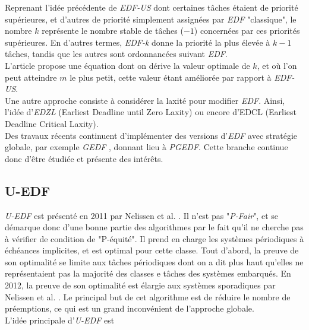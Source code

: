 \documentclass[11pt,a4paper,oneside]{report}
\begin{document}
Reprenant l'idée précédente de \textit{EDF-US} dont certaines tâches étaient de priorité 
supérieures, et d'autres de priorité simplement assignées par \textit{EDF} "classique", 
le nombre $k$ représente le nombre stable de tâches ($-1$) concernées par ces priorités 
supérieures. En d'autres termes, \textit{EDF-k} donne la priorité la plus élevée à 
$k - 1$ tâches, tandis que les autres sont ordonnancées suivant \textit{EDF}.\\

L'article propose une équation dont on dérive la valeur optimale de $k$, et où l'on peut 
atteindre $m$ le plus petit, cette valeur étant améliorée par rapport à \textit{EDF-US}.\\

Une autre approche consiste à considérer la laxité pour modifier \textit{EDF}. 
Ainsi, l'idée d'\textit{EDZL} (Earliest Deadline until Zero Laxity) \cite{cirinei_edzl_2007} ou encore d'EDCL \cite{kato_real-time_2007}
(Earliest Deadline Critical Laxity). \\

Des travaux récents continuent d'implémenter des versions d'\textit{EDF} avec stratégie 
globale, par exemple \textit{GEDF} \cite{li_global_2015}, donnant lieu à \textit{PGEDF}. Cette 
branche continue donc d'être étudiée et présente des intérêts.

\subsection{U-EDF}
\textit{U-EDF} est présenté en 2011 par Nelissen et al. \cite{nelissen_reducing_2011}. Il n'est pas "\textit{P-Fair}", et se démarque donc d'une bonne partie des algorithmes 
par le fait qu'il ne cherche pas à vérifier de condition de "P-équité".
Il prend en charge les systèmes périodiques à échéances implicites, et est optimal pour cette classe. 
Tout d'abord, la preuve de son optimalité se limite aux tâches périodiques dont on a dit plus haut qu'elles 
ne représentaient pas la majorité des classes e tâches des systèmes embarqués. 
En 2012, la preuve de son optimalité est élargie aux systèmes sporadiques par  Nelissen et al. \cite{nelissen_u-edf:_2012}. Le principal but de cet algorithme est de réduire le nombre de préemptions, 
ce qui est un grand inconvénient de l'approche globale. \\
L'idée principale d'\textit{U-EDF} est %
\end{document}
